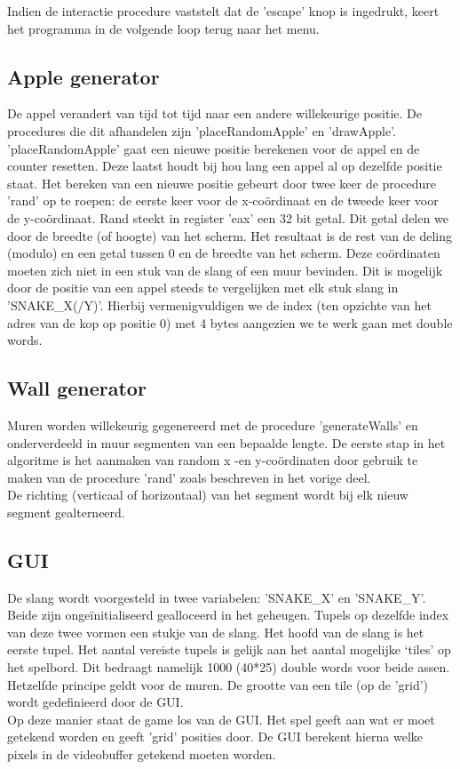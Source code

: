 \documentclass[11pt,a4paper]{article}
\begin{document}
Indien de interactie procedure vaststelt dat de 'escape' knop is ingedrukt, keert het programma in de volgende loop terug naar het menu.

\subsection{Apple generator}
De appel verandert van tijd tot tijd naar een andere willekeurige positie. De procedures die dit afhandelen zijn 'placeRandomApple' en 'drawApple'.
'placeRandomApple' gaat een nieuwe positie berekenen voor de appel en de counter resetten. Deze laatst houdt bij hou lang een appel al op dezelfde positie staat. Het bereken van een nieuwe positie gebeurt door twee keer de procedure 'rand' op te roepen: de eerste keer voor de x-co\"ordinaat en de tweede keer voor de y-co\"ordinaat. Rand steekt in register 'eax' een 32 bit getal. Dit getal delen we door de breedte (of hoogte) van het scherm. Het resultaat is de rest van de deling (modulo) en een getal tussen 0 en de breedte van het scherm. Deze co\"ordinaten moeten zich niet in een stuk van de slang of een muur bevinden. Dit is mogelijk door de positie van een appel steeds te vergelijken met elk stuk slang in 'SNAKE\_X(/Y)'. Hierbij vermenigvuldigen we de index (ten opzichte van het adres van de kop op positie 0) met 4 bytes aangezien we te werk gaan met double words.

\subsection{Wall generator}
Muren worden willekeurig gegenereerd met de procedure 'generateWalls' en onderverdeeld in muur segmenten van een bepaalde lengte. 
De eerste stap in het algoritme is het aanmaken van random x -en y-co\"ordinaten door gebruik te maken van de procedure 'rand' zoals beschreven in het vorige deel. \\
De richting (verticaal of horizontaal) van het segment wordt bij elk nieuw segment gealterneerd.

\subsection{GUI}
De slang wordt voorgesteld in twee variabelen: 'SNAKE\_X' en 'SNAKE\_Y'. Beide zijn onge\"initialiseerd gealloceerd in het geheugen. Tupels op dezelfde index van deze twee vormen een stukje van de slang. Het hoofd van de slang is het eerste tupel. Het aantal vereiste tupels is gelijk aan het aantal mogelijke ‘tiles’ op het spelbord. Dit bedraagt namelijk 1000 (40*25) double words voor beide assen. Hetzelfde principe geldt voor de muren. De grootte van een tile (op de 'grid') wordt gedefinieerd door de GUI. \\
Op deze manier staat de game los van de GUI. Het spel geeft aan wat er moet getekend worden en geeft 'grid' posities door. De GUI berekent hierna welke pixels in de videobuffer getekend moeten worden. 
\end{document}
